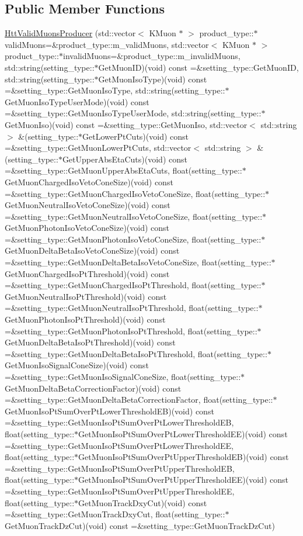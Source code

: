 \subsection*{Public Member Functions}
\begin{DoxyCompactItemize}
\item 
\hyperlink{classHttValidMuonsProducer_a44dc5ea86aa4e09ec653d08d9ebbb03f}{HttValidMuonsProducer} (std::vector$<$ KMuon $\ast$ $>$ product\_\-type::$\ast$validMuons=\&product\_\-type::m\_\-validMuons, std::vector$<$ KMuon $\ast$ $>$ product\_\-type::$\ast$invalidMuons=\&product\_\-type::m\_\-invalidMuons, std::string(setting\_\-type::$\ast$GetMuonID)(void) const =\&setting\_\-type::GetMuonID, std::string(setting\_\-type::$\ast$GetMuonIsoType)(void) const =\&setting\_\-type::GetMuonIsoType, std::string(setting\_\-type::$\ast$GetMuonIsoTypeUserMode)(void) const =\&setting\_\-type::GetMuonIsoTypeUserMode, std::string(setting\_\-type::$\ast$GetMuonIso)(void) const =\&setting\_\-type::GetMuonIso, std::vector$<$ std::string $>$ \&(setting\_\-type::$\ast$GetLowerPtCuts)(void) const =\&setting\_\-type::GetMuonLowerPtCuts, std::vector$<$ std::string $>$ \&(setting\_\-type::$\ast$GetUpperAbsEtaCuts)(void) const =\&setting\_\-type::GetMuonUpperAbsEtaCuts, float(setting\_\-type::$\ast$GetMuonChargedIsoVetoConeSize)(void) const =\&setting\_\-type::GetMuonChargedIsoVetoConeSize, float(setting\_\-type::$\ast$GetMuonNeutralIsoVetoConeSize)(void) const =\&setting\_\-type::GetMuonNeutralIsoVetoConeSize, float(setting\_\-type::$\ast$GetMuonPhotonIsoVetoConeSize)(void) const =\&setting\_\-type::GetMuonPhotonIsoVetoConeSize, float(setting\_\-type::$\ast$GetMuonDeltaBetaIsoVetoConeSize)(void) const =\&setting\_\-type::GetMuonDeltaBetaIsoVetoConeSize, float(setting\_\-type::$\ast$GetMuonChargedIsoPtThreshold)(void) const =\&setting\_\-type::GetMuonChargedIsoPtThreshold, float(setting\_\-type::$\ast$GetMuonNeutralIsoPtThreshold)(void) const =\&setting\_\-type::GetMuonNeutralIsoPtThreshold, float(setting\_\-type::$\ast$GetMuonPhotonIsoPtThreshold)(void) const =\&setting\_\-type::GetMuonPhotonIsoPtThreshold, float(setting\_\-type::$\ast$GetMuonDeltaBetaIsoPtThreshold)(void) const =\&setting\_\-type::GetMuonDeltaBetaIsoPtThreshold, float(setting\_\-type::$\ast$GetMuonIsoSignalConeSize)(void) const =\&setting\_\-type::GetMuonIsoSignalConeSize, float(setting\_\-type::$\ast$GetMuonDeltaBetaCorrectionFactor)(void) const =\&setting\_\-type::GetMuonDeltaBetaCorrectionFactor, float(setting\_\-type::$\ast$GetMuonIsoPtSumOverPtLowerThresholdEB)(void) const =\&setting\_\-type::GetMuonIsoPtSumOverPtLowerThresholdEB, float(setting\_\-type::$\ast$GetMuonIsoPtSumOverPtLowerThresholdEE)(void) const =\&setting\_\-type::GetMuonIsoPtSumOverPtLowerThresholdEE, float(setting\_\-type::$\ast$GetMuonIsoPtSumOverPtUpperThresholdEB)(void) const =\&setting\_\-type::GetMuonIsoPtSumOverPtUpperThresholdEB, float(setting\_\-type::$\ast$GetMuonIsoPtSumOverPtUpperThresholdEE)(void) const =\&setting\_\-type::GetMuonIsoPtSumOverPtUpperThresholdEE, float(setting\_\-type::$\ast$GetMuonTrackDxyCut)(void) const =\&setting\_\-type::GetMuonTrackDxyCut, float(setting\_\-type::$\ast$GetMuonTrackDzCut)(void) const =\&setting\_\-type::GetMuonTrackDzCut)

\end{DoxyCompactItemize}
